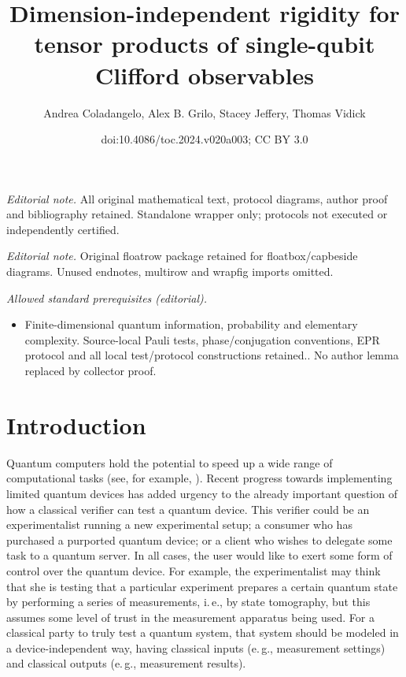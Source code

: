 \documentclass[11pt]{article}
\title{Dimension-independent rigidity for tensor products of single-qubit Clifford observables}
\author{Andrea Coladangelo, Alex B. Grilo, Stacey Jeffery, Thomas Vidick}
\date{doi:10.4086/toc.2024.v020a003; CC BY 3.0}
\numberwithin{equation}{section}
\theoremstyle{definition}
\theoremstyle{plain}
\newcommand{\ie}{i.\,e.}
\newcommand{\eg}{e.\,g.}
\begin{document}
\maketitle
\noindent\textit{Editorial note.} All original mathematical text, protocol diagrams, author proof and bibliography retained. Standalone wrapper only; protocols not executed or independently certified.\par\medskip
\noindent\textit{Editorial note.} Original floatrow package retained for floatbox/capbeside diagrams. Unused endnotes, multirow and wrapfig imports omitted.\par\medskip
\noindent\textit{Allowed standard prerequisites (editorial).}\begin{itemize}
\item Finite-dimensional quantum information, probability and elementary complexity. Source-local Pauli tests, phase/conjugation conventions, EPR protocol and all local test/protocol constructions retained.. No author lemma replaced by collector proof.
\end{itemize}\medskip
\section{Introduction}

Quantum computers hold the potential to speed up a wide range of computational tasks (see, for example, \cite{montanaro2016survey}). Recent progress towards implementing limited quantum devices has added urgency to the already important question of how a classical verifier can test a quantum device. This verifier could be an experimentalist running a new experimental setup; a consumer who has purchased a purported quantum device; or a client who wishes to delegate some task to a quantum server. In all cases, the user would like to exert some form of control over the quantum device. For example, the experimentalist may think that she is testing that a particular experiment prepares a certain quantum state by performing a series of measurements, \ie, by state tomography, but this assumes some level of trust in the measurement apparatus being used.  For a classical party to truly test a quantum system, that system should be modeled in a device-independent way, having classical inputs (\eg, measurement settings) and classical outputs (\eg, measurement results). 
\end{document}
